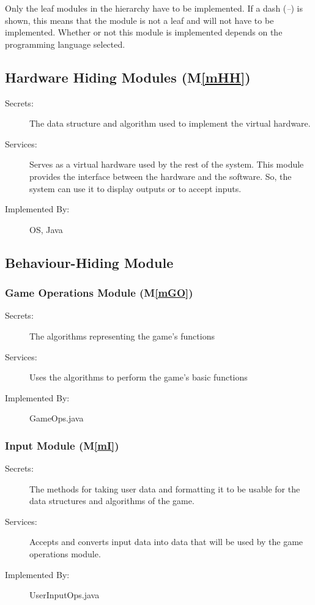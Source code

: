 \documentclass[12pt, titlepage]{article}
\newcommand{\mref}[1]{M\ref{#1}}
\begin{document}
Only the leaf modules in the
hierarchy have to be implemented. If a dash (\emph{--}) is shown, this means
that the module is not a leaf and will not have to be implemented. Whether or
not this module is implemented depends on the programming language
selected.

\subsection{Hardware Hiding Modules (\mref{mHH})}

\begin{description}
    \item[Secrets:]The data structure and algorithm used to implement the virtual
      hardware.
    \item[Services:]Serves as a virtual hardware used by the rest of the system. This module provides the interface between the hardware and the software. So, the system can use it to display outputs or to accept inputs.
    \item[Implemented By:] OS, Java
\end{description}

\subsection{Behaviour-Hiding Module}

\subsubsection{Game Operations Module (\mref{mGO})}
\begin{description}
    \item[Secrets:]The algorithms representing the game's functions
    \item[Services:]Uses the algorithms to perform the game's basic functions 
    \item[Implemented By:]GameOps.java
\end{description}

\subsubsection{Input Module (\mref{mI})}

\begin{description}
    \item[Secrets:]The methods for taking user data and formatting it to be usable for the data structures and algorithms of the game.
    \item[Services:]Accepts and converts input data into data that will be used by the game operations module.
    \item[Implemented By:]UserInputOps.java
\end{description}
\end{document}
